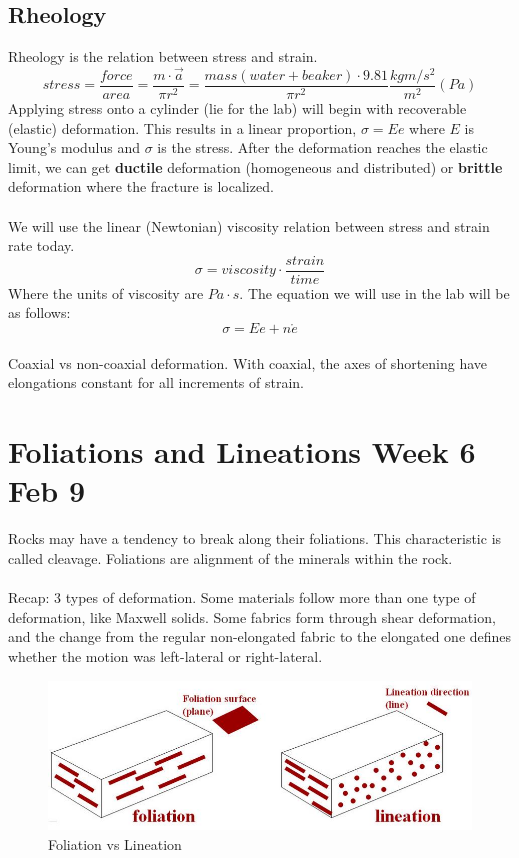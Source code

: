 \documentclass[12pt,a4paper]{report}
\begin{document}
\subsection*{Rheology}
Rheology is the relation between stress and strain.
$$ stress = \frac{force}{area} = \frac{m \cdot \vec{a}}{\pi r^2} = \frac{mass(water + beaker) \cdot 9.81}{\pi r^2} \frac{kg m/s^2}{m^2} (Pa)$$
Applying stress onto a cylinder (lie for the lab) will begin with recoverable (elastic) deformation.
This results in a linear proportion, $ \sigma = Ee $ where $E$ is Young's modulus and $\sigma$ is the stress.
After the deformation reaches the elastic limit, we can get \textbf{ductile} deformation (homogeneous and distributed) or \textbf{brittle} deformation where the fracture is localized.\\
\\
We will use the linear (Newtonian) viscosity relation between stress and strain rate today.
$$ \sigma = viscosity \cdot \frac{strain}{time} $$
Where the units of viscosity are $Pa \cdot s$.
The equation we will use in the lab will be as follows:
$$ \sigma = Ee + n\mathring{e} $$
\\
Coaxial vs non-coaxial deformation. With coaxial, the axes of shortening have elongations constant for all increments of strain.

\section*{Foliations and Lineations Week 6 Feb 9}
Rocks may have a tendency to break along their foliations.
This characteristic is called cleavage.
Foliations are alignment of the minerals within the rock.\\
\\
Recap: 3 types of deformation.
Some materials follow more than one type of deformation, like Maxwell solids.
Some fabrics form through shear deformation, and the change from the regular non-elongated fabric to the elongated one defines whether the motion was left-lateral or right-lateral.
\begin{figure}[h]
  \includegraphics[scale=0.40]{foliation-vs-lineation.jpg}
  \centering
  \caption{Foliation vs Lineation}
\end{figure}
\end{document}
